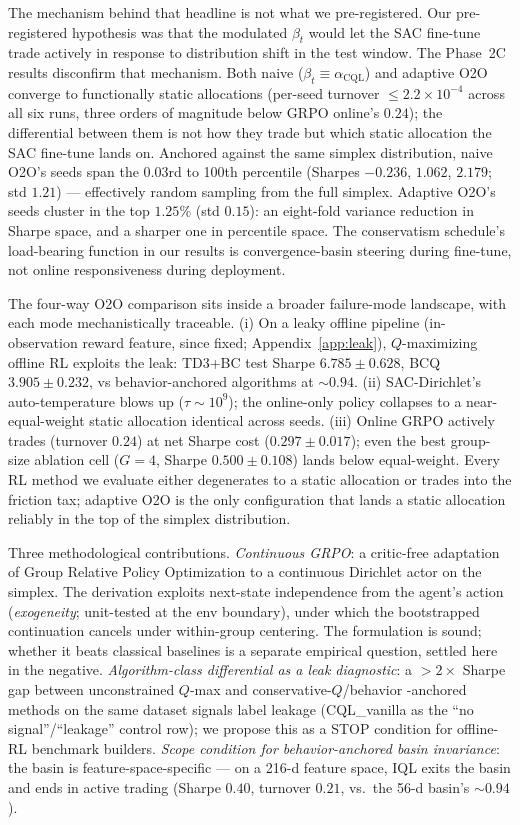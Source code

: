 The mechanism behind that headline is not what we pre-registered. Our
pre-registered hypothesis was that the modulated $\beta_t$ would let
the SAC fine-tune trade actively in response to distribution shift in
the test window. The Phase~2C results disconfirm that mechanism. Both
naive ($\beta_t \equiv \alpha_{\mathrm{CQL}}$) and adaptive O2O
converge to functionally static allocations (per-seed turnover
$\le 2.2\!\times\!10^{-4}$ across all six runs, three orders of
magnitude below GRPO online's $0.24$); the differential between them
is not how they trade but which static allocation the SAC fine-tune
lands on. Anchored against the same simplex distribution, naive O2O's
seeds span the 0.03rd to 100th percentile (Sharpes $-0.236$, $1.062$,
$2.179$; std $1.21$) --- effectively random sampling from the full
simplex. Adaptive O2O's seeds cluster in the top $1.25\%$ (std
$0.15$): an eight-fold variance reduction in Sharpe space, and a
sharper one in percentile space. The conservatism schedule's
load-bearing function in our results is convergence-basin steering
during fine-tune, not online responsiveness during deployment.

The four-way O2O comparison sits inside a broader failure-mode
landscape, with each mode mechanistically traceable. (i) On a leaky
offline pipeline (in-observation reward feature, since fixed;
Appendix~\ref{app:leak}), $Q$-maximizing offline RL exploits the leak:
TD3+BC test Sharpe $6.785 \pm 0.628$, BCQ $3.905 \pm 0.232$, vs
behavior-anchored algorithms at $\sim\!0.94$. (ii) SAC-Dirichlet's
auto-temperature blows up ($\tau \sim 10^9$); the online-only policy
collapses to a near-equal-weight static allocation identical across
seeds. (iii) Online GRPO actively trades (turnover $0.24$) at net
Sharpe cost ($0.297 \pm 0.017$); even the best group-size ablation
cell ($G{=}4$, Sharpe $0.500 \pm 0.108$) lands below equal-weight.
Every RL method we evaluate either degenerates to a static allocation
or trades into the friction tax; adaptive O2O is the only
configuration that lands a static allocation reliably in the top of
the simplex distribution.

Three methodological contributions. \emph{Continuous GRPO}: a
critic-free adaptation of Group Relative Policy Optimization to a
continuous Dirichlet actor on the simplex. The derivation exploits
next-state independence from the agent's action (\emph{exogeneity};
unit-tested at the env boundary), under which the bootstrapped
continuation cancels under within-group centering. The formulation is
sound; whether it beats classical baselines is a separate empirical
question, settled here in the negative.
\emph{Algorithm-class differential as a leak diagnostic}: a $> 2\times$
Sharpe gap between unconstrained $Q$-max and conservative-$Q$/behavior
-anchored methods on the same dataset signals label leakage
(CQL\_vanilla as the ``no signal''/``leakage'' control row); we
propose this as a STOP condition for offline-RL benchmark builders.
\emph{Scope condition for behavior-anchored basin invariance}: the
basin is feature-space-specific --- on a 216-d feature space, IQL
exits the basin and ends in active trading (Sharpe $0.40$, turnover
$0.21$, vs.\ the 56-d basin's $\sim\!0.94$).


